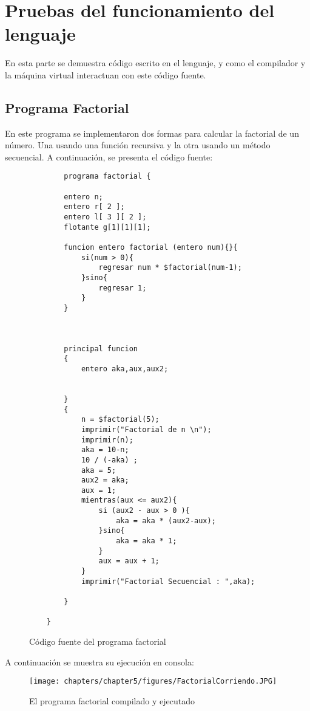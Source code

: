 \chapter{Pruebas del funcionamiento del lenguaje }

En esta parte se demuestra código escrito en el lenguaje, y como el compilador y la máquina virtual interactuan con este código fuente.

\section{Programa Factorial}
En este programa se implementaron dos formas para calcular la factorial de un número. Una usando una función recursiva y la otra usando un método secuencial.
A continuación, se presenta el código fuente:
\begin{figure}[htbp]
    \centering
    \begin{lstlisting}
        programa factorial { 
	
    	entero n;
    	entero r[ 2 ];
    	entero l[ 3 ][ 2 ];
    	flotante g[1][1][1];
    	
    	funcion entero factorial (entero num){}{
    		si(num > 0){
    			regresar num * $factorial(num-1);
    		}sino{
    			regresar 1;
    		}
    	}
    
    	
    
    	principal funcion
    	{
    		entero aka,aux,aux2;
    		
    
    	}
    	{
    		n = $factorial(5);
    		imprimir("Factorial de n \n");
    		imprimir(n);
    		aka = 10-n;
    		10 / (-aka) ;
    		aka = 5;
    		aux2 = aka;
    		aux = 1;
    		mientras(aux <= aux2){
    			si (aux2 - aux > 0 ){ 
    				aka = aka * (aux2-aux);
    			}sino{
    				aka = aka * 1;
    			}
    			aux = aux + 1;
    		}
    		imprimir("Factorial Secuencial : ",aka);
    		
    	} 
    
    }

    \end{lstlisting}
    \caption{Código fuente del programa factorial}
    \label{fig:my_label}
\end{figure}
\FloatBarrier

A continuación se muestra su ejecución en consola:
\begin{figure}[htbp]
    \centering
    \texttt{[image: chapters/chapter5/figures/FactorialCorriendo.JPG]}
    \caption{El programa factorial compilado y ejecutado}
    \label{fig:my_label}
\end{figure}
\FloatBarrier

